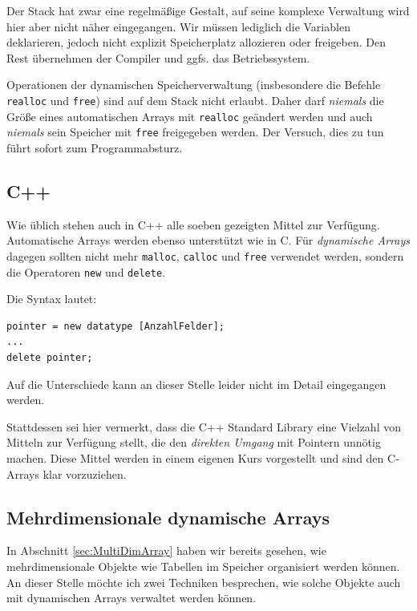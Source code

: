 Der Stack hat zwar eine regelmäßige Gestalt, auf seine komplexe Verwaltung wird hier aber nicht näher eingegangen. Wir müssen lediglich die Variablen deklarieren, jedoch nicht explizit Speicherplatz allozieren oder freigeben. Den Rest übernehmen der Compiler und ggfs. das Betriebssystem.

\begin{warnbox}
Operationen der dynamischen Speicherverwaltung (insbesondere die Befehle \texttt{realloc} und \texttt{free}) sind auf dem Stack nicht erlaubt. Daher darf \emph{niemals} die Größe eines automatischen Arrays mit \texttt{realloc} geändert werden und auch \emph{niemals} sein Speicher mit \texttt{free} freigegeben werden. Der Versuch, dies zu tun führt sofort zum Programmabsturz.
\end{warnbox}


\subsection{C++} \label{sec:ArrayCPP}
\begin{plusbox}
Wie üblich stehen auch in C++ alle soeben gezeigten Mittel zur Verfügung. Automatische Arrays werden ebenso unterstützt wie in C. Für \emph{dynamische Arrays} dagegen sollten nicht mehr \texttt{malloc}, \texttt{calloc} und \texttt{free} verwendet werden, sondern die Operatoren \texttt{new} und \texttt{delete}.

Die Syntax lautet:

\begin{codebox}
\begin{verbatim}
pointer = new datatype [AnzahlFelder];
...
delete pointer;
\end{verbatim}
\end{codebox}

Auf die Unterschiede kann an dieser Stelle leider nicht im Detail eingegangen werden.

Stattdessen sei hier vermerkt, dass die C++ Standard Library eine Vielzahl von Mitteln zur Verfügung stellt, die den \emph{direkten Umgang} mit Pointern unnötig machen. Diese Mittel werden in einem eigenen Kurs vorgestellt und sind den C-Arrays \idR klar vorzuziehen.
\end{plusbox}

\subsection{Mehrdimensionale dynamische Arrays}
In Abschnitt \ref{sec:MultiDimArray} haben wir bereits gesehen, wie mehrdimensionale Objekte wie Tabellen im Speicher organisiert werden können. An dieser Stelle möchte ich zwei Techniken besprechen, wie solche Objekte auch mit dynamischen Arrays verwaltet werden können.

